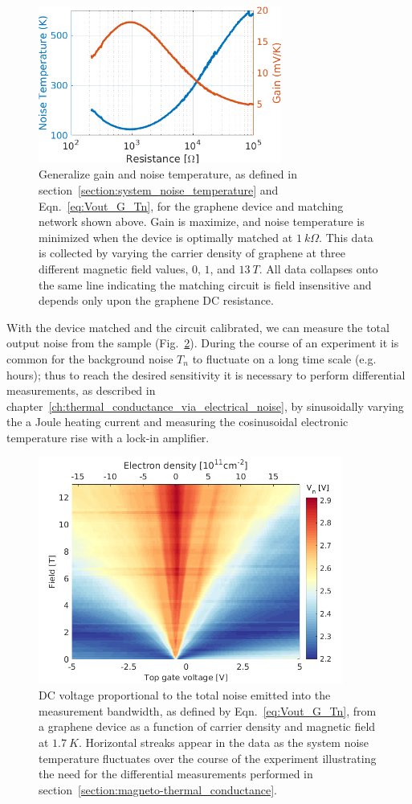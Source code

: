 \begin{figure}
\centering
\includegraphics[width=80mm]{figures/magneto/G_Tn.png}
\caption{Generalize gain and noise temperature, as defined in section~\ref{section:system_noise_temperature} and Eqn.~\ref{eq:Vout_G_Tn}, for the graphene device and matching network shown above. Gain is maximize, and noise temperature is minimized when the device is optimally matched at $1~k\Omega$. This data is collected by varying the carrier density of graphene at three different magnetic field values, $0$, $1$, and $13~T$. All data collapses onto the same line indicating the matching circuit is field insensitive and depends only upon the graphene DC resistance.}
\label{fig:m_G_Tn}
\end{figure}
With the device matched and the circuit calibrated, we can measure the total output noise from the sample (Fig.~\ref{fig:m_VNdc}). During the course of an experiment it is common for the background noise $T_n$ to fluctuate on a long time scale (e.g. hours); thus to reach the desired sensitivity it is necessary to perform differential measurements, as described in chapter~\ref{ch:thermal_conductance_via_electrical_noise}, by sinusoidally varying the a Joule heating current and measuring the cosinusoidal electronic temperature rise with a lock-in amplifier.
\begin{figure}
\centering
\includegraphics[width=100mm]{figures/magneto/Fan_VNdc.png}
\caption{DC voltage proportional to the total noise emitted into the measurement bandwidth, as defined by Eqn.~\ref{eq:Vout_G_Tn}, from a graphene device as a function of carrier density and magnetic field at $1.7~K$. Horizontal streaks appear in the data as the system noise temperature fluctuates over the course of the experiment illustrating the need for the differential measurements performed in section~\ref{section:magneto-thermal_conductance}.}
\label{fig:m_VNdc}
\end{figure}

